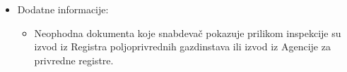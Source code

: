 \begin{itemize}
\begin{itemize}
		\end{itemize}
	\item Dodatne informacije:
		\begin{itemize}
			\item Neophodna dokumenta koje snabdevač pokazuje prilikom inspekcije su izvod iz Registra poljoprivrednih gazdinstava ili izvod iz Agencije za privredne registre.
		\end{itemize}						
\end{itemize}